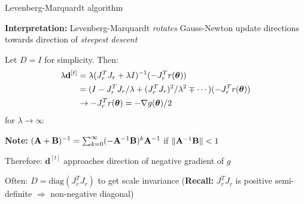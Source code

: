 \documentclass[11pt,compress,t,notes=noshow, xcolor=table]{beamer}
\begin{document}
\begin{framei}{Levenberg-Marquardt algorithm}
\item \textbf{Interpretation:} Levenberg-Marquardt \emph{rotates} Gauss-Newton update directions towards direction of \emph{steepest descent}
\item Let $D = I$ for simplicity. Then:
$$
\begin{aligned}
\lambda \mathbf{d}^{[t]} &= \lambda (J_r^T J_r + \lambda I)^{-1} (- J_r^T r(\bm{\theta})) \\
&= (I - J_r^T J_r / \lambda + (J_r^T J_r)^2 / \lambda^2 \mp \cdots) (- J_r^T r(\bm{\theta})) \\
&\to - J_r^T r(\bm{\theta}) = - \nabla g(\bm{\theta}) / 2
\end{aligned}
$$
for $\lambda \to \infty$
\item \textbf{Note:} $(\mathbf{A} + \mathbf{B})^{-1} = \sum_{k=0}^\infty (- \mathbf{A}^{-1} \mathbf{B})^k \mathbf{A}^{-1}$ if $\|\mathbf{A}^{-1} \mathbf{B}\| < 1$
\item Therefore: $\mathbf{d}^{[t]}$ approaches direction of negative gradient of $g$
\item Often: $D = \text{diag}(J_r^T J_r)$ to get scale invariance (\textbf{Recall:} $J_r^T J_r$ is positive semi-definite $\Rightarrow$ non-negative diagonal)
\end{framei}

\endlecture
\end{document}

